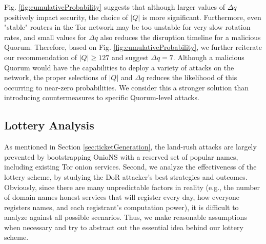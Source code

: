 \documentclass[USenglish,oneside,twocolumn]{article}
\begin{document}
Fig. \ref{fig:cumulativeProbability} suggests that although larger values of $ \Delta q $ positively impact security, the choice of $ \left\vert{Q}\right\vert $ is more significant. Furthermore, even "stable" routers in the Tor network may be too unstable for very slow rotation rates, and small values for $ \Delta q $ also reduces the disruption timeline for a malicious Quorum. Therefore, based on Fig. \ref{fig:cumulativeProbability}, we further reiterate our recommendation of $ \left\vert{Q}\right\vert \geq 127 $ and suggest $ \Delta q = 7 $. Although a malicious Quorum would have the capabilities to deploy a variety of attacks on the network, the proper selections of $ \left\vert{Q}\right\vert $ and $ \Delta q $ reduces the likelihood of this occurring to near-zero probabilities. We consider this a stronger solution than introducing countermeasures to specific Quorum-level attacks.

\subsection{Lottery Analysis}
\label{sec:lotteryAnalysisAppendix}

As mentioned in Section \ref{sec:ticketGeneration}, the land-rush attacks are largely prevented by bootstrapping OnioNS with a reserved set of popular names, including existing Tor onion services. Second, we analyze the effectiveness of the lottery scheme, by studying the DoR attacker's best strategies and outcomes. Obviously, since there are many unpredictable factors in reality (e.g., the number of domain names honest services that will register every day, how everyone registers names, and each registrant's computation power), it is difficult to analyze against all possible scenarios. Thus, we make reasonable assumptions when necessary and try to abstract out the essential idea behind our lottery scheme.
\end{document}
